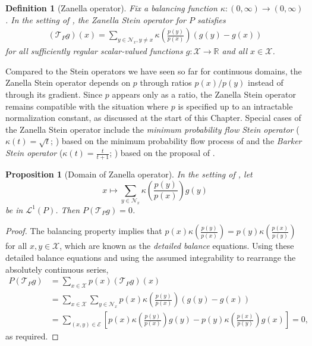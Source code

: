\documentclass[12pt,paper=letter]{scrreprt}
\newtheorem{proposition}{Proposition}[chapter]
\newtheorem{definition}{Definition}[chapter]
\def\reals{\mathbb{R}} %
\newcommand{\xset}[0]{\mathcal{X}} %
\newcommand{\TP}{\mathcal{T}_P}
\newcommand{\nbr}[1][x]{\mathcal{N}_{#1}} %
\newcommand{\Lp}[1][p]{\mathcal{L}^{#1}}
\begin{document}
\begin{definition}[Zanella operator] \label{def: Zanella SO}
Fix a balancing function $\kappa : (0,\infty) \rightarrow (0,\infty)$.
In the setting of , the \emph{Zanella Stein operator} for $P$ satisfies
\begin{align*}
    (\TP g)(x) = \sum_{y \in \nbr, y\neq x} \kappa\left(\frac{p(y)}{p(x)}\right) (g(y) - g(x)) 
\end{align*}
for all sufficiently regular scalar-valued functions $g : \xset \rightarrow \reals$ and all $x \in \xset$.
\end{definition}

Compared to the Stein operators we have seen so far for continuous domains, the Zanella Stein operator depends on $p$ through ratios $p(x) / p(y)$ instead of through its gradient.
Since $p$ appears only as a ratio, the Zanella Stein operator remains compatible with the situation where $p$ is specified up to an intractable normalization constant, as discussed at the start of this Chapter. 
Special cases of the Zanella Stein operator include the \emph{minimum probability flow Stein operator} ($\kappa(t) = \sqrt{t}$; \citealp{barp2019minimum}) based on the minimum probability flow process of \citet{sohldickstein2011minimumprobabilityflowlearning} and the \emph{Barker Stein operator} ($\kappa(t) = \frac{t}{t+1}$; \citealp{hodgkinson2020reproducing}) based on the proposal of \citet{barker1965monte}.

\begin{proposition}[Domain of Zanella operator]
    In the setting of , let 
    $$
    x \mapsto \sum_{y \in \nbr} \kappa\left( \frac{p(y)}{p(x)} \right) g(y)
    $$ 
    be in $\Lp[1](P)$.
    Then $P(\TP g) = 0$.
\end{proposition}
\begin{proof}
The balancing property implies that $p(x) \kappa\left(\frac{p(y)}{p(x)}\right) = p(y) \kappa\left(\frac{p(x)}{p(y)}\right)$ for all $x,y \in \xset$, which are known as the \emph{detailed balance} equations.
Using these detailed balance equations and using the assumed integrability to rearrange the absolutely continuous series,
    \begin{align*}
        P(\TP g) & = \sum_{x \in \xset} p(x) (\TP g)(x) \\
        & = \sum_{x \in \xset} \sum_{y \in \nbr} p(x) \kappa\left(\frac{p(y)}{p(x)}\right) (g(y) - g(x)) \\
        & = \sum_{(x,y) \in \mathcal{E}} \left[ p(x) \kappa\left(\frac{p(y)}{p(x)}\right) g(y) - p(y) \kappa\left(\frac{p(x)}{p(y)}\right) g(x) \right] = 0 ,
    \end{align*}
    as required.
\end{proof}
\end{document}
